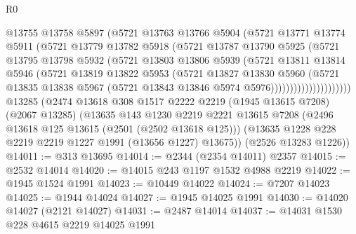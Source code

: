 \begin{lexlean}{R0}
\begin{coremodule}
                        @13755
                        @13758
                        @5897
                        (@5721
                          @13763
                          @13766
                          @5904
                          (@5721
                            @13771
                            @13774
                            @5911
                            (@5721
                              @13779
                              @13782
                              @5918
                              (@5721
                                @13787
                                @13790
                                @5925
                                (@5721
                                  @13795
                                  @13798
                                  @5932
                                  (@5721
                                    @13803
                                    @13806
                                    @5939
                                    (@5721
                                      @13811
                                      @13814
                                      @5946
                                      (@5721
                                        @13819
                                        @13822
                                        @5953
                                        (@5721
                                          @13827
                                          @13830
                                          @5960
                                          (@5721
                                            @13835
                                            @13838
                                            @5967
                                            (@5721 @13843 @13846 @5974 @5976)))))))))))))))))))))
    @13285
    (@2474
      @13618
      @308
      @1517
      @2222
      @2219
      (@1945 @13615 @7208)
      (@2067 @13285)
      (@13635
        @143
        @1230
        @2219
        @2221
        @13615
        @7208
        (@2496 @13618 @125 @13615 (@2501 (@2502 @13618 @125)))
        (@13635 @1228 @228 @2219 @2219 @1227 @1991 (@13656 @1227) @13675))
      (@2526 @13283 @1226))
@14011 := @313 @13695
@14014 := @2344 (@2354 @14011) @2357
@14015 := @2532 @14014
@14020 := @14015 @243 @1197 @1532 @4988 @2219
@14022 := @1945 @1524 @1991
@14023 := @10449 @14022
@14024 := @7207 @14023
@14025 := @1944 @14024
@14027 := @1945 @14025 @1991
@14030 := @14020 @14027 (@2121 @14027)
@14031 := @2487 @14014
@14037 := @14031 @1530 @228 @4615 @2219 @14025 @1991

\end{coremodule}
\end{lexlean}
